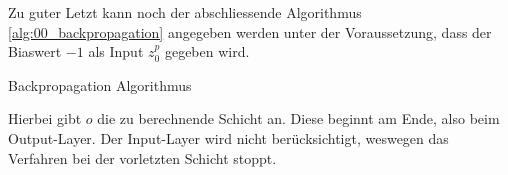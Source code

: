 Zu guter Letzt kann noch der abschliessende Algorithmus \ref{alg:00_backpropagation} angegeben werden unter der Voraussetzung,
dass der Biaswert $-1$ als Input $z_0^p$ gegeben wird.\\
\begin{algorithm}[H]
    \caption{Backpropagation Algorithmus}
    \label{alg:00_backpropagation}
\end{algorithm}
Hierbei gibt $o$ die zu berechnende Schicht an. Diese beginnt am Ende, also beim Output-Layer. Der Input-Layer wird nicht
berücksichtigt, weswegen das Verfahren bei der vorletzten Schicht stoppt.

\newpage
